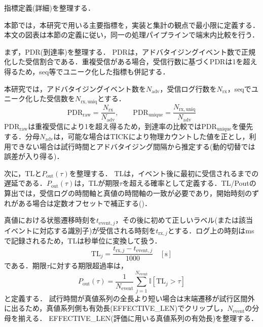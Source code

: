 ﻿%
指標定義(詳細)を整理する．
\label{sec:metrics_detail}

本節では，本研究で用いる主要指標を，実装と集計の観点で最小限に定義する．本文の図表は本節の定義に従い，同一の処理パイプラインで端末内比較を行う．

まず，PDR(到達率)を整理する．
PDRは，アドバタイジングイベント数で正規化した受信割合である．重複受信がある場合，受信行数に基づくPDRは1を超え得るため，seq等でユニーク化した指標も併記する．

本研究では，アドバタイジングイベント数を$N_{\mathrm{adv}}$，受信ログ行数を$N_{\mathrm{rx}}$，seqでユニーク化した受信数を$N_{\mathrm{rx,uniq}}$とする．
\begin{equation}
  \mathrm{PDR}_{\mathrm{raw}} = \frac{N_{\mathrm{rx}}}{N_{\mathrm{adv}}},\qquad
  \mathrm{PDR}_{\mathrm{unique}} = \frac{N_{\mathrm{rx,uniq}}}{N_{\mathrm{adv}}}
\end{equation}
$\mathrm{PDR}_{\mathrm{raw}}$は重複受信により1を超え得るため，到達率の比較では$\mathrm{PDR}_{\mathrm{unique}}$を優先する．分母$N_{\mathrm{adv}}$は，可能な場合はTICKにより物理カウントした値を正とし，利用できない場合は試行時間とアドバタイジング間隔から推定する(動的切替では誤差が入り得る)．

次に，\texorpdfstring{TLと$P_{\mathrm{out}}(\tau)$}{TLとPout(tau)}を整理する．
TLは，イベント後に最初に受信されるまでの遅延である．$P_{\mathrm{out}}(\tau)$は，TLが期限$\tau$を超える確率として定義する．TL/Poutの算出では，受信ログの時間軸と真値の時間軸の一致が必要であり，開始時刻のずれがある場合は定数オフセットで補正する()．

真値における状態遷移時刻を$t_{\mathrm{event},j}$，その後に初めて正しいラベル(または該当イベントに対応する識別子)が受信される時刻を$t_{\mathrm{rx},j}$とする．ログ上の時刻はmsで記録されるため，TLは秒単位に変換して扱う．
\begin{equation}
  \mathrm{TL}_j = \frac{t_{\mathrm{rx},j} - t_{\mathrm{event},j}}{1000}\quad [\mathrm{s}]
\end{equation}
である．期限$\tau$に対する期限超過率は，
\begin{equation}
P_{\mathrm{out}}(\tau)=\frac{1}{N_{\mathrm{event}}}\sum_{j=1}^{N_{\mathrm{event}}}\mathbb{I}[\mathrm{TL}_j>\tau]
\end{equation}
と定義する．
試行時間が真値系列の全長より短い場合は末端遷移が試行区間外に出るため，真値系列側も有効長(EFFECTIVE\_LEN)でクリップし，$N_{\mathrm{event}}$の分母を揃える．
EFFECTIVE\_LEN(評価に用いる真値系列の有効長)を整理する．

